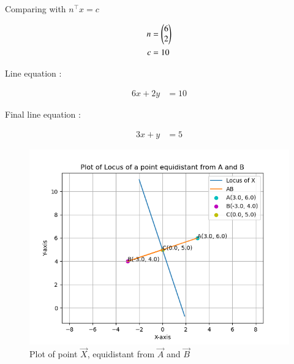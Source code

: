 \documentclass[journal]{IEEEtran}
\begin{document}
Comparing with $n^\top x=c$

\begin{align}
	n&=\begin{pmatrix}6 \\ 2\end{pmatrix}\\
	c&=10
\end{align}

Line equation :

\begin{align}
	6x+2y&=10
\end{align}

Final line equation :

\begin{align}
	3x+y&=5
\end{align}

\begin{figure}[h!]
   \centering
   \includegraphics[width=0.8\linewidth]{figs/plot.png}
   \caption{Plot of point $\vec{X}$, equidistant from $\vec{A}$ and $\vec{B}$}
\label{stemplot}
\end{figure}
\end{document}
